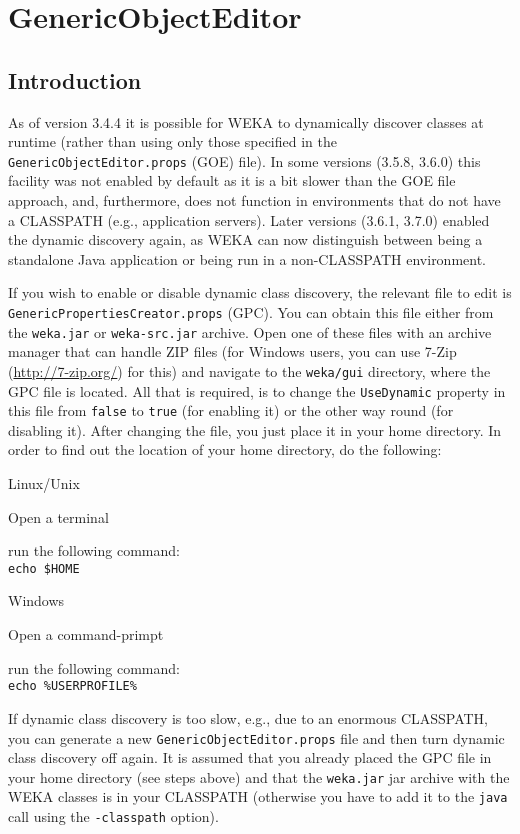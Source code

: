 \newpage

\section{GenericObjectEditor}

\subsection{Introduction}
As of version 3.4.4 it is possible for WEKA to dynamically discover
classes at runtime (rather than using only those specified in the
\verb=GenericObjectEditor.props= (GOE) file). In some versions 
(3.5.8, 3.6.0) this facility was not enabled by default as it is a bit slower
than the GOE file approach, and, furthermore, does not function in
environments that do not have a CLASSPATH (e.g., application servers). Later
versions (3.6.1, 3.7.0) enabled the dynamic discovery again, as WEKA can
now distinguish between being a standalone Java application or being run in a
non-CLASSPATH environment.

If you wish to enable or disable dynamic class discovery, the relevant file to
edit is \verb=GenericPropertiesCreator.props= (GPC). You can obtain this file
either from the \texttt{weka.jar} or \texttt{weka-src.jar} archive. Open one of
these files with an archive manager that can handle ZIP files (for Windows
users, you can use 7-Zip (\url{http://7-zip.org/}{}) for this) and
navigate to the \texttt{weka/gui} directory, where the GPC file is located. All
that is required, is to change the \verb=UseDynamic= property in this file from
\verb=false= to \verb=true= (for enabling it) or the other way round (for
disabling it). After changing the file, you just place it in your home
directory. In order to find out the location of your home directory,
do the following:
\begin{tight_itemize}
	\item Linux/Unix
		\begin{tight_itemize}
 			\item Open a terminal
			\item run the following command: \\
			\texttt{echo \$HOME}
		\end{tight_itemize}
	\item Windows
		\begin{tight_itemize}
 			\item Open a command-primpt
			\item run the following command: \\
			\texttt{echo \%USERPROFILE\%}
		\end{tight_itemize}
\end{tight_itemize}
If dynamic class discovery is too slow, e.g., due to an enormous CLASSPATH, you
can generate a new \verb=GenericObjectEditor.props= file and then turn dynamic
class discovery off again. It is assumed that you already placed the GPC file in
your home directory (see steps above) and that the \texttt{weka.jar} jar
archive with the WEKA classes is in your CLASSPATH (otherwise you have to add it
to the \texttt{java} call using the \texttt{-classpath} option). \\

